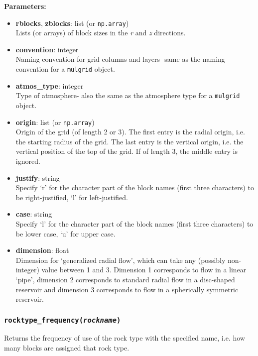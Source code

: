 \textbf{Parameters:}
\begin{itemize}
\item \textbf{rblocks}, \textbf{zblocks}: list (or \texttt{np.array})\\
  Lists (or arrays) of block sizes in the \emph{r} and \emph{z} directions.
\item \textbf{convention}: integer\\
  Naming convention for grid columns and layers- same as the naming convention for a \texttt{mulgrid} object.
\item \textbf{atmos\_type}: integer\\
  Type of atmosphere- also the same as the atmosphere type for a \texttt{mulgrid} object.
\item \textbf{origin}: list (or \texttt{np.array})\\
  Origin of the grid (of length 2 or 3).  The first entry is the radial origin, i.e. the starting radius of the grid.  The last entry is the vertical origin, i.e. the vertical position of the top of the grid.  If of length 3, the middle entry is ignored.
\item \textbf{justify}: string\\
  Specify `r' for the character part of the block names (first three characters) to be right-justified, `l' for left-justified.
\item \textbf{case}: string\\
  Specify `l' for the character part of the block names (first three characters) to be lower case, `u' for upper case.
\item \textbf{dimension}: float\\
  Dimension for `generalized radial flow', which can take any (possibly non-integer) value between 1 and 3.  Dimension 1 corresponds to flow in a linear `pipe', dimension 2 corresponds to standard radial flow in a disc-shaped reservoir and dimension 3 corresponds to flow in a spherically symmetric reservoir.
\end{itemize}

\begin{snugshade}
\subsubsection{\texttt{rocktype\_frequency(\emph{rockname})}}
\end{snugshade}
\label{sec:t2grid:rocktype_frequency}

Returns the frequency of use of the rock type with the specified name, i.e. how many blocks are assigned that rock type.

